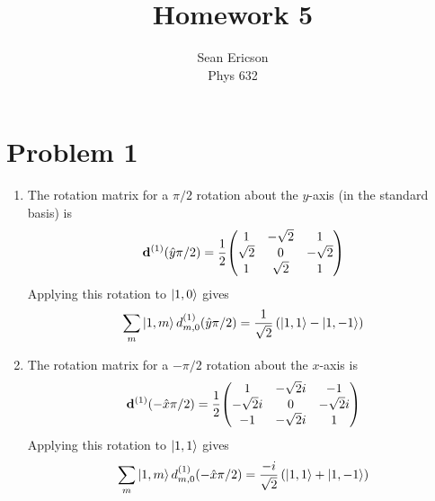 \documentclass[12pt]{article}
\begin{document}
	
\title{Homework 5}
\author{Sean Ericson \\ Phys 632}
\maketitle

\section*{Problem 1}
\begin{enumerate}[label=(\alph*)]
    \item The rotation matrix for a $\pi/2$ rotation about the $y$-axis (in the standard basis) is
    \[ \mathbf{d}^{(1)}(\hat{y}\pi/2) = \frac{1}{2}\mqty(1 & -\sqrt{2} & 1 \\ \sqrt{2} & 0 & -\sqrt{2} \\ 1 & \sqrt{2} & 1) \]
    Applying this rotation to $\ket{1, 0}$ gives
    \[ \sum_m\ket{1, m}d_{m,0}^{(1)}(\hat{y}\pi/2) = \frac{1}{\sqrt{2}}\left(\ket{1, 1} - \ket{1,-1}\right) \]

    \item The rotation matrix for a $-\pi/2$ rotation about the $x$-axis is
    \[ \mathbf{d}^{(1)}(-\hat{x}\pi/2) = \frac{1}{2}\mqty(1 & -\sqrt{2}i & -1 \\ -\sqrt{2}i & 0 & -\sqrt{2}i \\ -1 & -\sqrt{2}i & 1) \]
    Applying this rotation to $\ket{1,1}$ gives
    \[ \sum_m\ket{1,m}d_{m,0}^{(1)}(-\hat{x}\pi/2) = \frac{-i}{\sqrt{2}}\left(\ket{1, 1} + \ket{1, -1}\right) \]
\end{enumerate}
\end{document}
